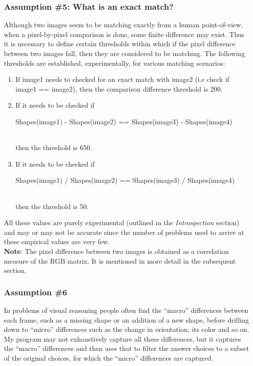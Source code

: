 \documentclass[10pt, letter]{article}
\begin{document}
	\subsubsection*{Assumption \#5: What is an exact match?}
Although two images seem to be matching exactly from a human point-of-view, when a pixel-by-pixel comparison is done, some finite difference may exist. Thus it is necessary to define certain thresholds within which if the pixel difference between two images fall, then they are considered to be matching. The following thresholds are established, experimentally, for various matching scenarios:
	\begin{enumerate}
		\item If image1 needs to checked for an exact match with image2 (i.e check if image1 == image2), then the comparison difference threshold is 200.
		\item If it needs to be checked if \\
		\centerline{Shapes(image1) - Shapes(image2) == Shapes(image3) - Shapes(image4)}\\
		then the threshold is 650.
		\item If it needs to be checked if \\
		\centerline{Shapes(image1) / Shapes(image2) == Shapes(image3) / Shapes(image4)}\\
		then the threshold is 50.
	\end{enumerate}
All these values are purely experimental (outlined in the \emph{Introspection} section) and may or may not be accurate since the number of problems used to arrive at these empirical values are very few.\\
\textbf{Note}: The pixel difference between two images is obtained as a correlation measure of the RGB matrix. It is mentioned in more detail in the subsequent section.
\subsubsection*{Assumption \#6}
In problems of visual reasoning people often find the ``macro'' differences between each frame, such as a missing shape or an addition of a new shape, before drilling down to ``micro'' differences such as the change in orientation, its color and so on. My program may not exhaustively capture all these differences, but it captures the ``macro'' differences and then uses that to filter the answer choices to a subset of the original choices, for which the ``micro'' differences are captured.
\end{document}
